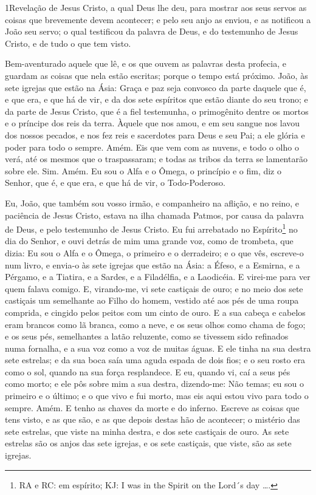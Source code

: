 
\lettrine{1} Revelação de Jesus Cristo, a qual Deus lhe deu,
para mostrar aos seus servos as coisas que brevemente devem
acontecer; e pelo seu anjo as enviou, e as notificou a João seu
servo; o qual testificou da palavra de Deus, e do testemunho de
Jesus Cristo, e de tudo o que tem visto.

Bem-aventurado aquele que lê, e os que ouvem as palavras desta
profecia, e guardam as coisas que nela estão escritas; porque o
tempo está próximo. João, às sete igrejas que estão na Ásia:
Graça e paz seja convosco da parte daquele que é, e que era, e que
há de vir, e da dos sete espíritos que estão diante do seu trono;
e da parte de Jesus Cristo, que é a fiel testemunha, o
primogênito dentre os mortos e o príncipe dos reis da terra. Àquele
que nos amou, e em seu sangue nos lavou dos nossos pecados, e
nos fez reis e sacerdotes para Deus e seu Pai; a ele glória e poder
para todo o sempre. Amém. Eis que vem com as nuvens, e todo o
olho o verá, até os mesmos que o traspassaram; e todas as tribos da
terra se lamentarão sobre ele. Sim. Amém. Eu sou o Alfa e o
Ômega, o princípio e o fim, diz o Senhor, que é, e que era, e que há
de vir, o Todo-Poderoso.

Eu, João, que também sou vosso irmão, e companheiro na aflição, e
no reino, e paciência de Jesus Cristo, estava na ilha chamada
Patmos, por causa da palavra de Deus, e pelo testemunho de Jesus
Cristo. Eu fui arrebatado no Espírito\footnote{RA e RC: em
espírito; KJ: I was in the Spirit on the Lord´s day \ldots{}.} no
dia do Senhor, e ouvi detrás de mim uma grande voz, como de
trombeta, que dizia: Eu sou o Alfa e o Ômega, o primeiro e o
derradeiro; e o que vês, escreve-o num livro, e envia-o às sete
igrejas que estão na Ásia: a Éfeso, e a Esmirna, e a Pérgamo, e a
Tiatira, e a Sardes, e a Filadélfia, e a Laodicéia. E
virei-me para ver quem falava comigo. E, virando-me, vi sete
castiçais de ouro; e no meio dos sete castiçais um semelhante
ao Filho do homem, vestido até aos pés de uma roupa comprida, e
cingido pelos peitos com um cinto de ouro. E a sua cabeça e
cabelos eram brancos como lã branca, como a neve, e os seus olhos
como chama de fogo; e os seus pés, semelhantes a latão
reluzente, como se tivessem sido refinados numa fornalha, e a sua
voz como a voz de muitas águas. E ele tinha na sua destra
sete estrelas; e da sua boca saía uma aguda espada de dois fios; e o
seu rosto era como o sol, quando na sua força resplandece. E
eu, quando vi, caí a seus pés como morto; e ele pôs sobre mim a sua
destra, dizendo-me: Não temas; eu sou o primeiro e o último;
e o que vivo e fui morto, mas eis aqui estou vivo para todo o
sempre. Amém. E tenho as chaves da morte e do inferno.
Escreve as coisas que tens visto, e as que são, e as que
depois destas hão de acontecer; o mistério das sete estrelas,
que viste na minha destra, e dos sete castiçais de ouro. As sete
estrelas são os anjos das sete igrejas, e os sete castiçais, que
viste, são as sete igrejas.

